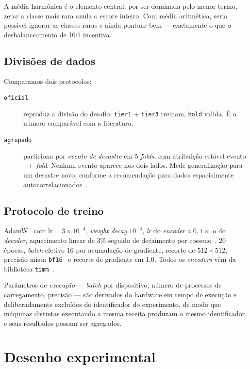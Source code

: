 \documentclass[11pt,a4paper]{article}
\begin{document}
A média harmônica é o elemento central: por ser dominada pelo menor termo,
zerar a classe mais rara anula o escore inteiro. Com média aritmética, seria
possível ignorar as classes raras e ainda pontuar bem --- exatamente o que o
desbalanceamento de 10:1 incentiva.

\subsection{Divisões de dados}
\label{sec:splits}

Comparamos dois protocolos:

\begin{description}
  \item[\texttt{oficial}] reproduz a divisão do desafio: \texttt{tier1} +
  \texttt{tier3} treinam, \texttt{hold} valida. É o número comparável com a
  literatura.
  \item[\texttt{agrupado}] particiona por \emph{evento de desastre} em 5
  \emph{folds}, com atribuição estável evento $\rightarrow$ \emph{fold}. Nenhum
  evento aparece nos dois lados. Mede generalização para um desastre novo,
  conforme a recomendação para dados espacialmente
  autocorrelacionados~\cite{roberts2017}.
\end{description}

\subsection{Protocolo de treino}

AdamW~\cite{loshchilov2019} com $\text{lr}=3\times10^{-4}$, \emph{weight decay}
$10^{-4}$, \emph{lr} do \emph{encoder} a $0{,}1\times$ o do \emph{decoder},
aquecimento linear de 3\% seguido de decaimento por cosseno~\cite{loshchilov2017},
20 épocas, \emph{batch} efetivo 16 por acumulação de gradiente, recorte de
$512\times512$, precisão mista \texttt{bf16}~\cite{micikevicius2018} e recorte de
gradiente em 1{,}0. Todos os \emph{encoders} vêm da biblioteca
\texttt{timm}~\cite{timm}.

Parâmetros de \emph{execução} --- \emph{batch} por dispositivo, número de
processos de carregamento, precisão --- são derivados do hardware em tempo de
execução e deliberadamente excluídos do identificador do experimento, de modo que
máquinas distintas executando a mesma receita produzam o mesmo identificador e
seus resultados possam ser agregados.

\section{Desenho experimental}
\label{sec:desenho}
\end{document}
